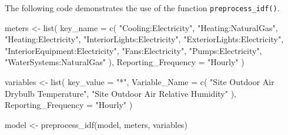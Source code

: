 \documentclass[
]{book}
\newenvironment{Shaded}{\begin{snugshade}}{\end{snugshade}}
\newcommand{\AttributeTok}[1]{\textcolor[rgb]{0.77,0.63,0.00}{#1}}
\newcommand{\CommentTok}[1]{\textcolor[rgb]{0.56,0.35,0.01}{\textit{#1}}}
\newcommand{\ConstantTok}[1]{\textcolor[rgb]{0.00,0.00,0.00}{#1}}
\newcommand{\ControlFlowTok}[1]{\textcolor[rgb]{0.13,0.29,0.53}{\textbf{#1}}}
\newcommand{\FunctionTok}[1]{\textcolor[rgb]{0.00,0.00,0.00}{#1}}
\newcommand{\NormalTok}[1]{#1}
\newcommand{\OtherTok}[1]{\textcolor[rgb]{0.56,0.35,0.01}{#1}}
\newcommand{\SpecialCharTok}[1]{\textcolor[rgb]{0.00,0.00,0.00}{#1}}
\newcommand{\StringTok}[1]{\textcolor[rgb]{0.31,0.60,0.02}{#1}}
\begin{document}
\begin{Shaded}
\end{Shaded}

The following code demonstrates the use of the function \texttt{preprocess\_idf()}.

\begin{Shaded}
\begin{Highlighting}[]
\NormalTok{meters }\OtherTok{\textless{}{-}} \FunctionTok{list}\NormalTok{(}
    \AttributeTok{key\_name =} \FunctionTok{c}\NormalTok{(}
        \StringTok{"Cooling:Electricity"}\NormalTok{,}
        \StringTok{"Heating:NaturalGas"}\NormalTok{,}
        \StringTok{"Heating:Electricity"}\NormalTok{,}
        \StringTok{"InteriorLights:Electricity"}\NormalTok{,}
        \StringTok{"ExteriorLights:Electricity"}\NormalTok{,}
        \StringTok{"InteriorEquipment:Electricity"}\NormalTok{,}
        \StringTok{"Fans:Electricity"}\NormalTok{,}
        \StringTok{"Pumps:Electricity"}\NormalTok{,}
        \StringTok{"WaterSystems:NaturalGas"}
\NormalTok{    ),}
    \AttributeTok{Reporting\_Frequency =} \StringTok{"Hourly"}
\NormalTok{)}

\NormalTok{variables }\OtherTok{\textless{}{-}} \FunctionTok{list}\NormalTok{(}
    \AttributeTok{key\_value =} \StringTok{"*"}\NormalTok{,}
    \AttributeTok{Variable\_Name =} \FunctionTok{c}\NormalTok{(}
        \StringTok{"Site Outdoor Air Drybulb Temperature"}\NormalTok{,}
        \StringTok{"Site Outdoor Air Relative Humidity"}
\NormalTok{    ),}
    \AttributeTok{Reporting\_Frequency =} \StringTok{"Hourly"}
\NormalTok{)}

\NormalTok{model }\OtherTok{\textless{}{-}} \FunctionTok{preprocess\_idf}\NormalTok{(model, meters, variables)}
\end{Highlighting}
\end{Shaded}
\end{document}
